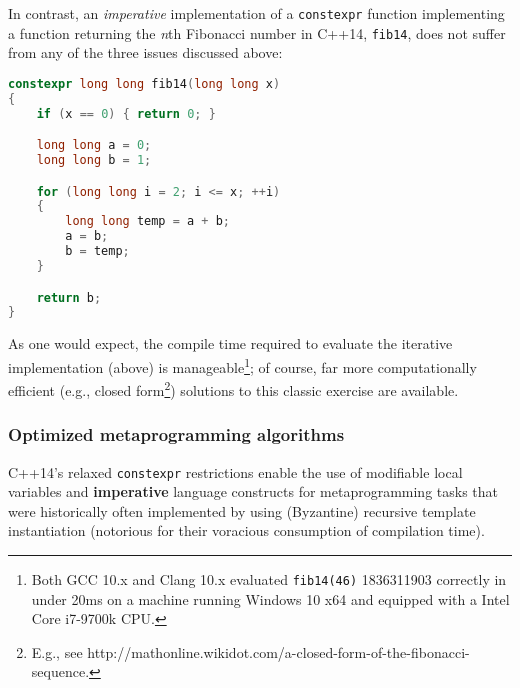 In contrast, an \emph{imperative} implementation of a \texttt{constexpr}
function implementing a function returning the \emph{n\/}th Fibonacci
number in C++14, \texttt{fib14}, does not suffer from any of the three
issues discussed above:

\begin{lstlisting}[language=C++]
constexpr long long fib14(long long x)
{
    if (x == 0) { return 0; }

    long long a = 0;
    long long b = 1;

    for (long long i = 2; i <= x; ++i)
    {
        long long temp = a + b;
        a = b;
        b = temp;
    }

    return b;
}
\end{lstlisting}

\noindent As one would expect, the compile time required to evaluate the iterative
implementation (above) is manageable{\cprotect\footnote{Both GCC 10.x
and Clang 10.x evaluated \texttt{fib14(46)} 1836311903 correctly in
under 20ms on a machine running Windows 10 x64 and equipped with a
  Intel Core i7-9700k CPU.}}; of course, far more
computationally efficient (e.g., closed form{\cprotect\footnote{E.g.,
see
  http://mathonline.wikidot.com/a-closed-form-of-the-fibonacci-sequence.}})
solutions to this classic exercise are available.

\subsubsection[Optimized metaprogramming algorithms]{Optimized metaprogramming algorithms}\label{optimized-metaprogramming-algorithms}

C++14's relaxed \texttt{constexpr} restrictions enable the use of
modifiable local variables and \textbf{imperative} language constructs
for metaprogramming tasks that were historically often implemented by
using (Byzantine) recursive template instantiation (notorious for their
voracious consumption of compilation time).

